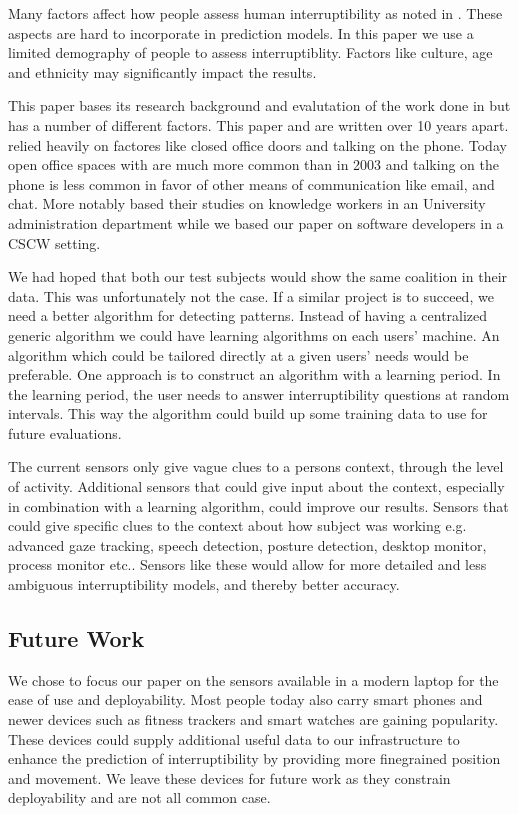 \documentclass{sigchi}
\begin{document}
Many factors affect how people assess human interruptibility as noted in \cite{Avrahami2007}.
These aspects are hard to incorporate in prediction models.
In this paper we use a limited demography of people to assess interruptiblity.
Factors like culture, age and ethnicity may significantly impact the results.

This paper bases its research background and evalutation of the work done in \cite{fogarty2005predicting} but has a number of different factors. This paper and \cite{fogarty2005predicting} are written over 10 years apart. \cite{fogarty2005predicting} relied heavily on factores like closed office doors and talking on the phone. Today open office spaces with are much more common than in 2003 and talking on the phone is less common in favor of other means of communication like email, and chat. More notably \cite{fogarty2005predicting} based their studies on knowledge workers in an University administration department while we based our paper on software developers in a CSCW setting.

We had hoped that both our test subjects would show the same coalition in their data.
This was unfortunately not the case.
If a similar project is to succeed, we need a better algorithm for detecting patterns.
Instead of having a centralized generic algorithm we could have learning algorithms on each users' machine.
An algorithm which could be tailored directly at a given users' needs would be preferable.
One approach is to construct an algorithm with a learning period.
In the learning period, the user needs to answer interruptibility questions at random intervals.
This way the algorithm could build up some training data to use for future evaluations.

The current sensors only give vague clues to a persons context, through the level of activity.
Additional sensors that could give input about the context, especially in combination with a learning algorithm, could improve our results.
Sensors that could give specific clues to the context about how subject was working e.g. advanced gaze tracking, speech detection, posture detection, desktop monitor, process monitor etc..
Sensors like these would allow for more detailed and less ambiguous interruptibility models, and thereby better accuracy.


\subsection{Future Work}
We chose to focus our paper on the sensors available in a modern laptop for the ease of use and deployability.
Most people today also carry smart phones and newer devices such as fitness trackers and smart watches are gaining popularity.
These devices could supply additional useful data to our infrastructure to enhance the prediction of interruptibility by providing more finegrained position and movement.
We leave these devices for future work as they constrain deployability and are not all common case.
\end{document}
